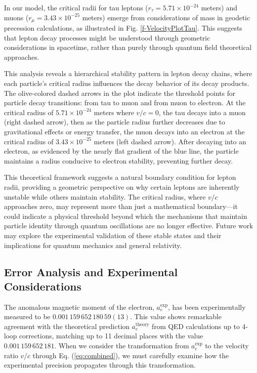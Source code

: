 \documentclass[%
 reprint,
 amsmath,amssymb,
 aps,
]{revtex4-1}
\numberwithin{equation}{section}%
\begin{document}
In our model, the critical radii for tau leptons ($r_\tau = 5.71 \times 10^{-24}$ meters) and muons ($r_\mu = 3.43 \times 10^{-25}$ meters) emerge from considerations of mass in geodetic precession calculations, as illustrated in Fig. \ref{f-VelocityPlotTau}. This suggests that lepton decay processes might be understood through geometric considerations in spacetime, rather than purely through quantum field theoretical approaches.

This analysis reveals a hierarchical stability pattern in lepton decay chains, where each particle's critical radius influences the decay behavior of its decay products. The olive-colored dashed arrows in the plot indicate the threshold points for particle decay transitions: from tau to muon and from muon to electron. At the critical radius of $5.71 \times 10^{-24}$ meters where $v/c = 0$, the tau decays into a muon (right dashed arrow), then as the particle radius further decreases due to gravitational effects or energy transfer, the muon decays into an electron at the critical radius of $3.43 \times 10^{-25}$ meters (left dashed arrow). After decaying into an electron, as evidenced by the nearly flat gradient of the blue line, the particle maintains a radius conducive to electron stability, preventing further decay.

This theoretical framework suggests a natural boundary condition for lepton radii, providing a geometric perspective on why certain leptons are inherently unstable while others maintain stability. The critical radius, where $v/c$ approaches zero, may represent more than just a mathematical boundary—it could indicate a physical threshold beyond which the mechanisms that maintain particle identity through quantum oscillations are no longer effective. Future work may explore the experimental validation of these stable states and their implications for quantum mechanics and general relativity.


\subsection{Error Analysis and Experimental Considerations}
\label{sec:ErrorAnalysisAnd}

The anomalous magnetic moment of the electron, $a_e^{\text{exp}}$, has been experimentally measured to be $0.001\,159\,652\,180\,59(13)$. This value shows remarkable agreement with the theoretical prediction $a_e^{\text{theory}}$ from QED calculations up to 4-loop corrections, matching up to 11 decimal places with the value $0.001\,159\,652\,181$. When we consider the transformation from $a_e^{\text{exp}}$ to the velocity ratio $v/c$ through Eq. (\ref{eq:combined}), we must carefully examine how the experimental precision propagates through this transformation.
\end{document}
